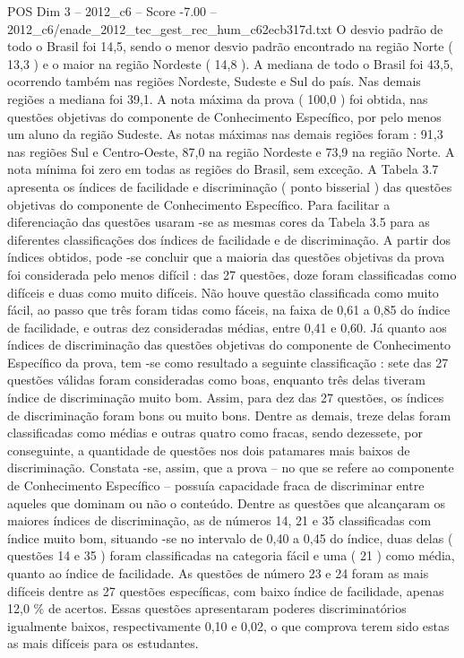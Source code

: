 \begin{textsample}{POS Dim 3 – 2012\_c6 – Score -7.00 – 2012\_c6/enade\_2012\_tec\_gest\_rec\_hum\_c62ecb317d.txt}
O desvio padrão de todo o Brasil foi 14,5, sendo o menor desvio padrão encontrado na região Norte ( 13,3 ) e o maior na região Nordeste ( 14,8 ).
A mediana de todo o Brasil foi 43,5, ocorrendo também nas regiões Nordeste, Sudeste e Sul do país.
Nas demais regiões a mediana foi 39,1.
A nota máxima da prova ( 100,0 ) foi obtida, nas questões objetivas do componente de Conhecimento Específico, por pelo menos um aluno da região Sudeste.
As notas máximas nas demais regiões foram : 91,3 nas regiões Sul e Centro-Oeste, 87,0 na região Nordeste e 73,9 na região Norte.
A nota mínima foi zero em todas as regiões do Brasil, sem exceção.
A Tabela 3.7 apresenta os índices de facilidade e discriminação ( ponto bisserial ) das questões objetivas do componente de Conhecimento Específico.
Para facilitar a diferenciação das questões usaram -se as mesmas cores da Tabela 3.5 para as diferentes classificações dos índices de facilidade e de discriminação.
A partir dos índices obtidos, pode -se concluir que a maioria das questões objetivas da prova foi considerada pelo menos difícil : das 27 questões, doze foram classificadas como difíceis e duas como muito difíceis.
Não houve questão classificada como muito fácil, ao passo que três foram tidas como fáceis, na faixa de 0,61 a 0,85 do índice de facilidade, e outras dez consideradas médias, entre 0,41 e 0,60.
Já quanto aos índices de discriminação das questões objetivas do componente de Conhecimento Específico da prova, tem -se como resultado a seguinte classificação : sete das 27 questões válidas foram consideradas como boas, enquanto três delas tiveram índice de discriminação muito bom.
Assim, para dez das 27 questões, os índices de discriminação foram bons ou muito bons.
Dentre as demais, treze delas foram classificadas como médias e outras quatro como fracas, sendo dezessete, por conseguinte, a quantidade de questões nos dois patamares mais baixos de discriminação.
Constata -se, assim, que a prova – no que se refere ao componente de Conhecimento Específico – possuía capacidade fraca de discriminar entre aqueles que dominam ou não o conteúdo.
Dentre as questões que alcançaram os maiores índices de discriminação, as de números 14, 21 e 35 classificadas com índice muito bom, situando -se no intervalo de 0,40 a 0,45 do índice, duas delas ( questões 14 e 35 ) foram classificadas na categoria fácil e uma ( 21 ) como média, quanto ao índice de facilidade.
As questões de número 23 e 24 foram as mais difíceis dentre as 27 questões específicas, com baixo índice de facilidade, apenas 12,0 \% de acertos.
Essas questões apresentaram poderes discriminatórios igualmente baixos, respectivamente 0,10 e 0,02, o que comprova terem sido estas as mais difíceis para os estudantes.

\end{textsample}
